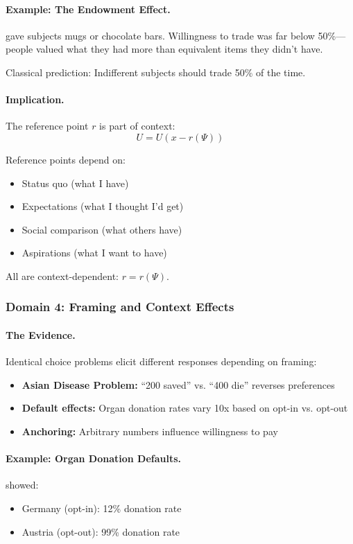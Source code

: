 \documentclass[12pt,a4paper]{article}
\begin{document}
\paragraph{Example: The Endowment Effect.}
\citet{knetschetal1990} gave subjects mugs or chocolate bars.
Willingness to trade was far below 50\%---people valued what they had
more than equivalent items they didn't have.

Classical prediction: Indifferent subjects should trade 50\% of the time.

\paragraph{Implication.}
The reference point $r$ is part of context:
\begin{equation}
  U = U(x - r(\Psi))
\end{equation}

Reference points depend on:
\begin{itemize}
  \item Status quo (what I have)
  \item Expectations (what I thought I'd get)
  \item Social comparison (what others have)
  \item Aspirations (what I want to have)
\end{itemize}

All are context-dependent: $r = r(\Psi)$.

\subsubsection{Domain 4: Framing and Context Effects}

\paragraph{The Evidence.}
Identical choice problems elicit different responses depending on framing:
\begin{itemize}
  \item \textbf{Asian Disease Problem:} ``200 saved'' vs. ``400 die'' reverses preferences
  \item \textbf{Default effects:} Organ donation rates vary 10x based on opt-in vs. opt-out
  \item \textbf{Anchoring:} Arbitrary numbers influence willingness to pay
\end{itemize}

\paragraph{Example: Organ Donation Defaults.}
\citet{johnsonetal2003} showed:
\begin{itemize}
  \item Germany (opt-in): 12\% donation rate
  \item Austria (opt-out): 99\% donation rate
\end{itemize}
\end{document}
